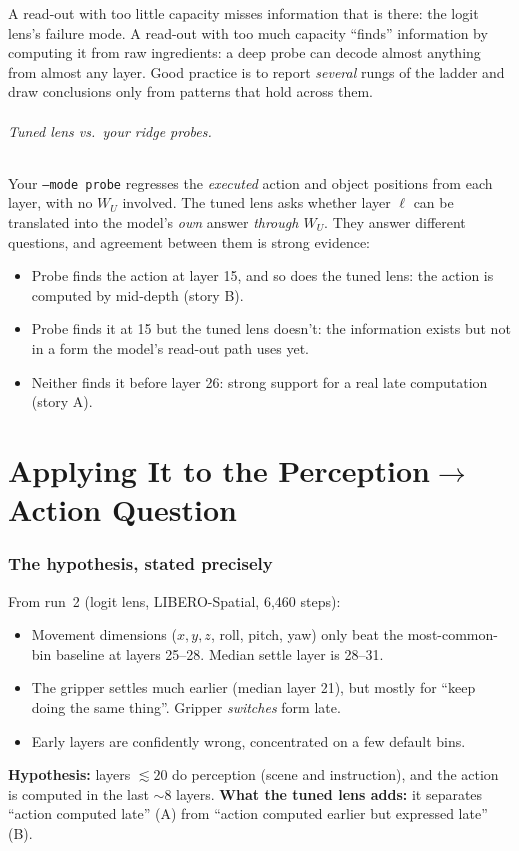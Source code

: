 \documentclass[11pt]{article}
\begin{document}
\begin{mental}
A read-out with too little capacity misses information that is there: the logit lens's failure mode. A read-out with too much capacity ``finds'' information by computing it from raw ingredients: a deep probe can decode almost anything from almost any layer. Good practice is to report \emph{several} rungs of the ladder and draw conclusions only from patterns that hold across them.
\end{mental}

\paragraph{Tuned lens vs.\ your ridge probes.} Your \texttt{--mode probe} regresses the \emph{executed} action and object positions from each layer, with no $W_U$ involved. The tuned lens asks whether layer $\ell$ can be translated into the model's \emph{own} answer \emph{through $W_U$}. They answer different questions, and agreement between them is strong evidence:
\begin{itemize}
  \item Probe finds the action at layer 15, and so does the tuned lens: the action is computed by mid-depth (story B).
  \item Probe finds it at 15 but the tuned lens doesn't: the information exists but not in a form the model's read-out path uses yet.
  \item Neither finds it before layer 26: strong support for a real late computation (story A).
\end{itemize}

\part{Applying It to the Perception$\to$Action Question}

\section{The hypothesis, stated precisely}

From run~2 (logit lens, LIBERO-Spatial, 6{,}460 steps):
\begin{itemize}
  \item Movement dimensions ($x,y,z$, roll, pitch, yaw) only beat the most-common-bin baseline at layers 25--28. Median settle layer is 28--31.
  \item The gripper settles much earlier (median layer 21), but mostly for ``keep doing the same thing''. Gripper \emph{switches} form late.
  \item Early layers are confidently wrong, concentrated on a few default bins.
\end{itemize}
\textbf{Hypothesis:} layers $\lesssim 20$ do perception (scene and instruction), and the action is computed in the last $\sim$8 layers.
\textbf{What the tuned lens adds:} it separates ``action computed late'' (A) from ``action computed earlier but expressed late'' (B).
\end{document}
